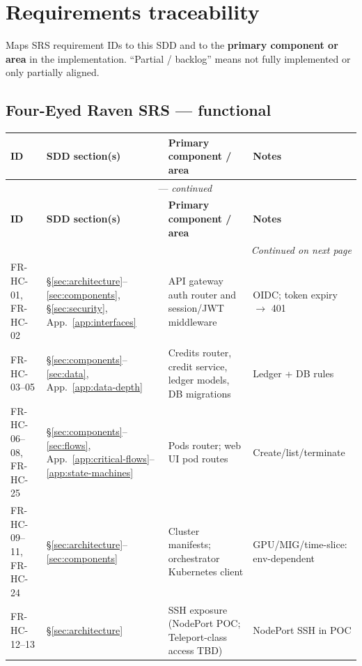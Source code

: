\documentclass[12pt,a4paper]{article}
\begin{document}
\appendix

\section{Requirements traceability}
\label{app:traceability}

Maps SRS requirement IDs to this SDD and to the \textbf{primary component or area} in the implementation. ``Partial / backlog'' means not fully implemented or only partially aligned.

\subsection{Four-Eyed Raven SRS --- functional}

{\small
\begin{longtable}{@{}p{2.4cm} p{2.8cm} p{4.2cm} p{4.8cm}@{}}
  \toprule
  \textbf{ID} & \textbf{SDD section(s)} & \textbf{Primary component / area} & \textbf{Notes} \\
  \midrule
  \endfirsthead
  \multicolumn{4}{c}{\tablename\ \thetable{} --- \textit{continued}} \\
  \toprule
  \textbf{ID} & \textbf{SDD section(s)} & \textbf{Primary component / area} & \textbf{Notes} \\
  \midrule
  \endhead
  \midrule
  \multicolumn{4}{r}{\textit{Continued on next page}} \\
  \endfoot
  \bottomrule
  \endlastfoot
  FR-HC-01, FR-HC-02 & \S\ref{sec:architecture}--\ref{sec:components}, \S\ref{sec:security}, App.~\ref{app:interfaces} & API gateway auth router and session/JWT middleware & OIDC; token expiry $\rightarrow$ 401 \\
  FR-HC-03--05 & \S\ref{sec:components}--\ref{sec:data}, App.~\ref{app:data-depth} & Credits router, credit service, ledger models, DB migrations & Ledger + DB rules \\
  FR-HC-06--08, FR-HC-25 & \S\ref{sec:components}--\ref{sec:flows}, App.~\ref{app:critical-flows}--\ref{app:state-machines} & Pods router; web UI pod routes & Create/list/terminate \\
  FR-HC-09--11, FR-HC-24 & \S\ref{sec:architecture}--\ref{sec:components} & Cluster manifests; orchestrator Kubernetes client & GPU/MIG/time-slice: env-dependent \\
  FR-HC-12--13 & \S\ref{sec:architecture} & SSH exposure (NodePort POC; Teleport-class access TBD) & NodePort SSH in POC \\

\end{longtable}}
\end{document}
